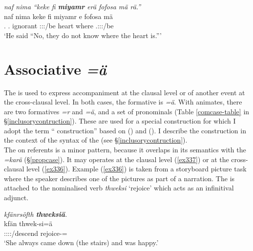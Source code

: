 \begin{exe}
	\ex \emph{naf nima ``keke fi \textbf{miyamr} erä fofosa mä rä.''}\\
	\gll naf nima keke fi miyamr e fofosa mä \\
	\Tsg.\Erg{} \Quot{} \Neg{} \Third.\Abs{} ignorant \Stpl:\Sbj:\Nonpast:\Ipfv/be heart where \Tsg.\F:\Sbj:\Nonpast:\Ipfv/be\\
	\trans `He said ``No, they do not know where the heart is.'''\\
	\label{ex356}
\end{exe}%

\section{Associative \emph{=ä}} \label{comcase}

The   is used to express accompaniment at the clausal level or  of another event at the cross-clausal level. In both cases, the formative is \emph{=ä}. With animates, there are two formatives \emph{=r} and \emph{=ä}, and a set of pronominals (Table \ref{comcase-table} in \S{}\ref{inclusorycontruction}). These are used for a special construction for which I adopt the term `` construction'' based on (\citealt{Lichtenberk:2000hr}) and (\citealt{Singer:inclu}). I describe the  construction in the context of the syntax of the  (see \S{}\ref{inclusorycontruction}).\\  

The   on  referents is a minor pattern, because it overlaps in its semantics with the   \emph{=karä} (\S{}\ref{propcase}). It may operates at the clausal level (\ref{ex337}) or at the cross-clausal level (\ref{ex336}). Example (\ref{ex336}) is taken from a storyboard picture task where the speaker describes one of the pictures as part of a narration. The  is attached to the nominalised verb \emph{thweksi} `rejoice' which acts as an infinitival adjunct. 

\begin{exe}
	\ex \emph{kfänrsöfth \textbf{thweksiä}.}\\
	\gll kfän thwek-si=ä\\
	\Stsg:\Sbj:\Pst:\Iter:\Venit/descend rejoice-\Nmlz=\Assoc{}\\
	\trans `She always came down (the stairs) and was happy.'
	\label{ex336}
\end{exe}

